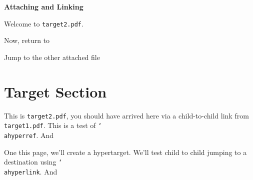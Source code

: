 \documentclass{article}
\newcommand{\cs}[1]{\texttt{\char`\\#1}}
\begin{document}
\hfill\textbf{Attaching and Linking}\hfill{}

\bigskip

Welcome to \texttt{target2.pdf}.


Now, return to 

Jump to the other attached file 

\newpage
\section{Target Section}\label{targetsection}

This is \texttt{target2.pdf}, you should have arrived here via a child-to-child link from
\texttt{target1.pdf}. This is a test of \cs{ahyperref}. And 

\newpage
One this page, we'll create a
\hypertarget{myhypertarget}{hypertarget}. We'll test child to child
jumping to a destination using \cs{ahyperlink}. And 
\end{document}
